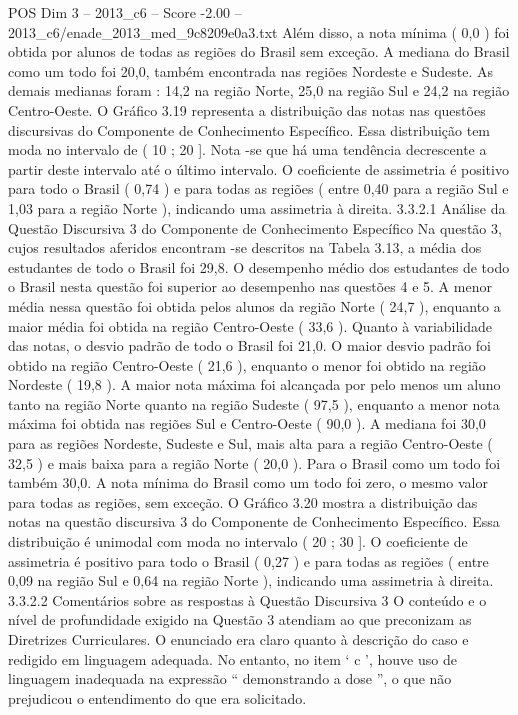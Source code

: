 \begin{textsample}{POS Dim 3 – 2013\_c6 – Score -2.00 – 2013\_c6/enade\_2013\_med\_9c8209e0a3.txt}
Além disso, a nota mínima ( 0,0 ) foi obtida por alunos de todas as regiões do Brasil sem exceção.
A mediana do Brasil como um todo foi 20,0, também encontrada nas regiões Nordeste e Sudeste.
As demais medianas foram : 14,2 na região Norte, 25,0 na região Sul e 24,2 na região Centro-Oeste.
O Gráfico 3.19 representa a distribuição das notas nas questões discursivas do Componente de Conhecimento Específico.
Essa distribuição tem moda no intervalo de ( 10 ; 20 ].
Nota -se que há uma tendência decrescente a partir deste intervalo até o último intervalo.
O coeficiente de assimetria é positivo para todo o Brasil ( 0,74 ) e para todas as regiões ( entre 0,40 para a região Sul e 1,03 para a região Norte ), indicando uma assimetria à direita. 3.3.2.1 Análise da Questão Discursiva 3 do Componente de Conhecimento Específico Na questão 3, cujos resultados aferidos encontram -se descritos na Tabela 3.13, a média dos estudantes de todo o Brasil foi 29,8.
O desempenho médio dos estudantes de todo o Brasil nesta questão foi superior ao desempenho nas questões 4 e 5.
A menor média nessa questão foi obtida pelos alunos da região Norte ( 24,7 ), enquanto a maior média foi obtida na região Centro-Oeste ( 33,6 ).
Quanto à variabilidade das notas, o desvio padrão de todo o Brasil foi 21,0.
O maior desvio padrão foi obtido na região Centro-Oeste ( 21,6 ), enquanto o menor foi obtido na região Nordeste ( 19,8 ).
A maior nota máxima foi alcançada por pelo menos um aluno tanto na região Norte quanto na região Sudeste ( 97,5 ), enquanto a menor nota máxima foi obtida nas regiões Sul e Centro-Oeste ( 90,0 ).
A mediana foi 30,0 para as regiões Nordeste, Sudeste e Sul, mais alta para a região Centro-Oeste ( 32,5 ) e mais baixa para a região Norte ( 20,0 ).
Para o Brasil como um todo foi também 30,0.
A nota mínima do Brasil como um todo foi zero, o mesmo valor para todas as regiões, sem exceção.
O Gráfico 3.20 mostra a distribuição das notas na questão discursiva 3 do Componente de Conhecimento Específico.
Essa distribuição é unimodal com moda no intervalo ( 20 ; 30 ].
O coeficiente de assimetria é positivo para todo o Brasil ( 0,27 ) e para todas as regiões ( entre 0,09 na região Sul e 0,64 na região Norte ), indicando uma assimetria à direita. 3.3.2.2 Comentários sobre as respostas à Questão Discursiva 3 O conteúdo e o nível de profundidade exigido na Questão 3 atendiam ao que preconizam as Diretrizes Curriculares.
O enunciado era claro quanto à descrição do caso e redigido em linguagem adequada.
No entanto, no item ‘ c ’, houve uso de linguagem inadequada na expressão “ demonstrando a dose ”, o que não prejudicou o entendimento do que era solicitado.

\end{textsample}
